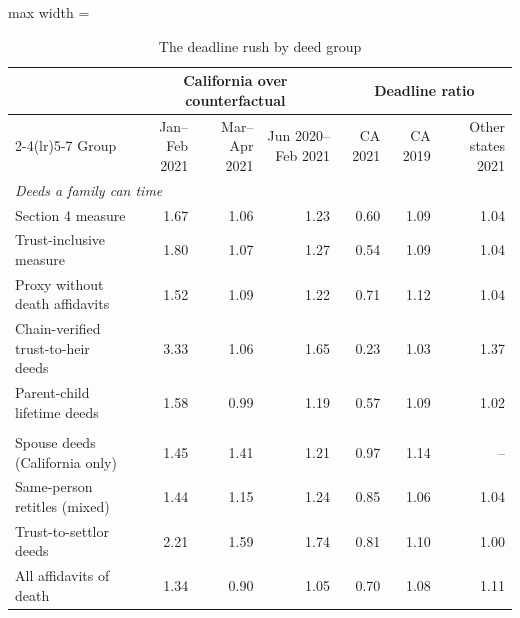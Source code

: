 \begin{table}[!ht]\centering
\caption{The deadline rush by deed group}
\label{tab:s4rush}
{\small
\begin{adjustbox}{max width = \textwidth}
\begin{tabular}{lrrrrrr}
\toprule
 & \multicolumn{3}{c}{California over counterfactual} & \multicolumn{3}{c}{Deadline ratio} \\
\cmidrule(lr){2-4}\cmidrule(lr){5-7}
Group & Jan--Feb 2021 & Mar--Apr 2021 & Jun 2020--Feb 2021 & CA 2021 & CA 2019 & Other states 2021 \\
\midrule
\multicolumn{7}{l}{\emph{Deeds a family can time}} \\
Section 4 measure & 1.67 & 1.06 & 1.23 & 0.60 & 1.09 & 1.04 \\
Trust-inclusive measure & 1.80 & 1.07 & 1.27 & 0.54 & 1.09 & 1.04 \\
Proxy without death affidavits & 1.52 & 1.09 & 1.22 & 0.71 & 1.12 & 1.04 \\
Chain-verified trust-to-heir deeds & 3.33 & 1.06 & 1.65 & 0.23 & 1.03 & 1.37 \\
Parent-child lifetime deeds & 1.58 & 0.99 & 1.19 & 0.57 & 1.09 & 1.02 \\
\addlinespace
\multicolumn{7}{l}{\emph{Comparison series}} \\
Spouse deeds (California only) & 1.45 & 1.41 & 1.21 & 0.97 & 1.14 & -- \\
Same-person retitles (mixed) & 1.44 & 1.15 & 1.24 & 0.85 & 1.06 & 1.04 \\
Trust-to-settlor deeds & 2.21 & 1.59 & 1.74 & 0.81 & 1.10 & 1.00 \\
All affidavits of death & 1.34 & 0.90 & 1.05 & 0.70 & 1.08 & 1.11 \\
\bottomrule
\end{tabular}
\end{adjustbox}}
\begin{minipage}{0.95\textwidth}\end{minipage}
\end{table}
